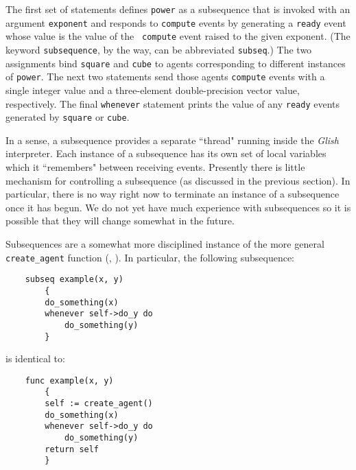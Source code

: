 The first set of statements defines {\tt power} as a subsequence that is
invoked with an argument {\tt exponent} and responds to {\tt compute} events
by generating a {\tt ready} event whose value is the value of the {\tt
compute} event raised to the given exponent.  (The keyword {\tt subsequence},
by the way, can be abbreviated {\tt subseq}.)
The two assignments bind {\tt square}
and {\tt cube} to agents corresponding to different instances of {\tt power}.
The next two statements send those agents {\tt compute} events with a single
integer value and a three-element double-precision vector value, respectively.
The final {\tt whenever} statement prints the value of any {\tt ready} events
generated by {\tt square} or {\tt cube}.

In a sense, a subsequence provides a separate ``thread" running inside
the {\em Glish} interpreter.  Each instance of a subsequence has its own set
of local variables which it ``remembers" between receiving events.  Presently
there is little mechanism for controlling a subsequence (as discussed in
the previous section).  In particular, there is no way right now to
terminate an instance of a subsequence once it has begun.
We do not yet have much experience with subsequences so it is
possible that they will change somewhat in the future.

\begin{sloppy}
Subsequences are a somewhat more disciplined instance of the
more general {\tt create\_agent} function (,
).  In particular, the following subsequence:
\begin{verbatim}
    subseq example(x, y)
        {
        do_something(x)
        whenever self->do_y do
            do_something(y)
        }
\end{verbatim}
is identical to:
\begin{verbatim}
    func example(x, y)
        {
        self := create_agent()
        do_something(x)
        whenever self->do_y do
            do_something(y)
        return self
        }
\end{verbatim}
\end{sloppy}
